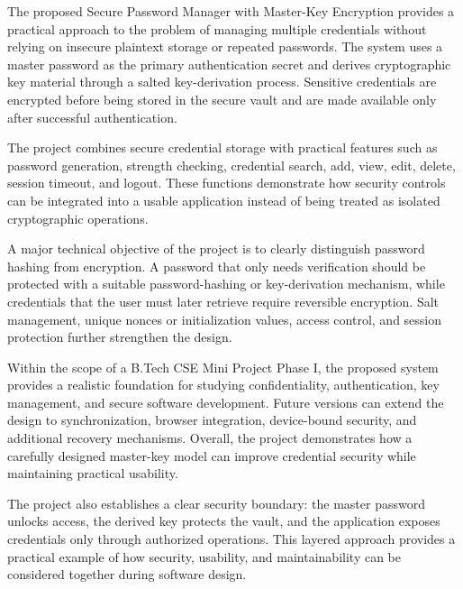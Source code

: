 \documentclass[12pt,a4paper,oneside]{report}
\begin{document}
The proposed Secure Password Manager with Master-Key Encryption provides a practical approach to the problem of managing multiple credentials without relying on insecure plaintext storage or repeated passwords. The system uses a master password as the primary authentication secret and derives cryptographic key material through a salted key-derivation process. Sensitive credentials are encrypted before being stored in the secure vault and are made available only after successful authentication.

The project combines secure credential storage with practical features such as password generation, strength checking, credential search, add, view, edit, delete, session timeout, and logout. These functions demonstrate how security controls can be integrated into a usable application instead of being treated as isolated cryptographic operations.

A major technical objective of the project is to clearly distinguish password hashing from encryption. A password that only needs verification should be protected with a suitable password-hashing or key-derivation mechanism, while credentials that the user must later retrieve require reversible encryption. Salt management, unique nonces or initialization values, access control, and session protection further strengthen the design.

Within the scope of a B.Tech CSE Mini Project Phase I, the proposed system provides a realistic foundation for studying confidentiality, authentication, key management, and secure software development. Future versions can extend the design to synchronization, browser integration, device-bound security, and additional recovery mechanisms. Overall, the project demonstrates how a carefully designed master-key model can improve credential security while maintaining practical usability.

The project also establishes a clear security boundary: the master password unlocks access, the derived key protects the vault, and the application exposes credentials only through authorized operations. This layered approach provides a practical example of how security, usability, and maintainability can be considered together during software design.
\end{document}
